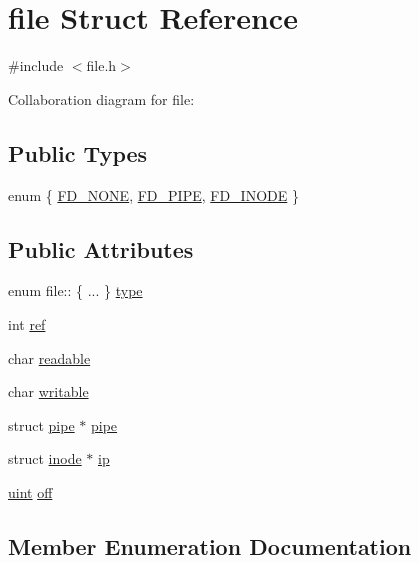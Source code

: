 \hypertarget{structfile}{}\section{file Struct Reference}
\label{structfile}


{\ttfamily \#include $<$file.\+h$>$}



Collaboration diagram for file\+:
\subsection*{Public Types}
\begin{DoxyCompactItemize}
\item 
enum \{ \hyperlink{structfile_adcfd105f46b2868a7694fa7f38de263fa224e095442d50a6bd1058fd742fb68c7}{F\+D\+\_\+\+N\+O\+NE}, 
\hyperlink{structfile_adcfd105f46b2868a7694fa7f38de263fa59fcf59caf6e70c3cc3cc48291b89752}{F\+D\+\_\+\+P\+I\+PE}, 
\hyperlink{structfile_adcfd105f46b2868a7694fa7f38de263faa5d8c5e0d95ed88367e96ecebfdf326d}{F\+D\+\_\+\+I\+N\+O\+DE}
 \}
\end{DoxyCompactItemize}
\subsection*{Public Attributes}
\begin{DoxyCompactItemize}
\item 
enum file\+:: \{ ... \}  \hyperlink{structfile_aeb945bc9619708cd2d5f7ae28faf922a}{type}
\item 
int \hyperlink{structfile_a41c818f828adea488058bca63e4df23f}{ref}
\item 
char \hyperlink{structfile_a0c5c8eced8bc562dbbecc8d450a6b646}{readable}
\item 
char \hyperlink{structfile_a6e1b641ea1551ac4316a0c11a683df45}{writable}
\item 
struct \hyperlink{structpipe}{pipe} $\ast$ \hyperlink{structfile_a19d83a8d6cb47902fe8c762d2798c198}{pipe}
\item 
struct \hyperlink{structinode}{inode} $\ast$ \hyperlink{structfile_a4fd095f927715574dc2a4f243690e508}{ip}
\item 
\hyperlink{custom__types_8h_a91ad9478d81a7aaf2593e8d9c3d06a14}{uint} \hyperlink{structfile_a94a911be6cc1b1326728392d8b40150d}{off}
\end{DoxyCompactItemize}


\subsection{Member Enumeration Documentation}
